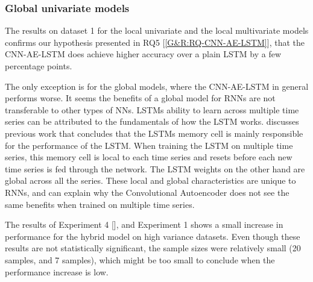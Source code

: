 \subsubsection{Global univariate models}



The results on dataset 1 for the local univariate and the local multivariate models
confirms our hypothesis presented in RQ5 [\ref{G&R:RQ-CNN-AE-LSTM}], that the
CNN-AE-LSTM does achieve higher accuracy over a plain LSTM by a few percentage points.

The only exception is for the global models, where the CNN-AE-LSTM in general performs worse.
It seems the benefits of a global model for RNNs are not transferable to other types
of NNs. LSTMs ability to learn across multiple time series can be attributed to the fundamentals
of how the LSTM works. \cite{Zhao2019} discusses previous work that concludes that
the LSTMs memory cell is mainly responsible for the performance of the LSTM.
When training the LSTM on multiple time series, this memory cell is local to each
time series and resets before each new time series is fed through the network.
The LSTM weights on the other hand are global across all the series.
These local and global characteristics are unique to RNNs, and can explain
why the Convolutional Autoencoder does not see the same benefits when trained on multiple
time series.

The results of Experiment 4 [],
and Experiment 1 shows a small increase in performance for the hybrid model on high variance datasets.
Even though these results are not statistically significant, the sample sizes were relatively small
(20 samples, and 7 samples), which might be too small to conclude when the
performance increase is low.

